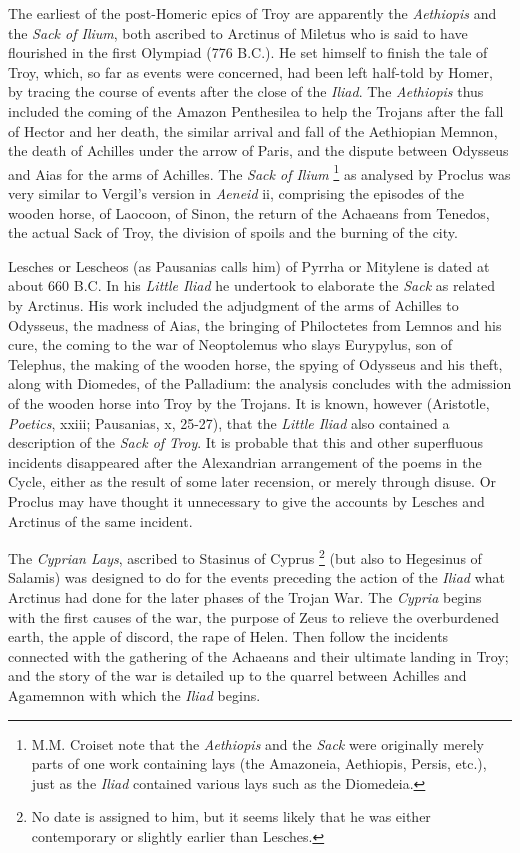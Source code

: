 The earliest of the post-Homeric epics of Troy are apparently the
\emph{Aethiopis} and the \emph{Sack of Ilium}, both ascribed to Arctinus of
Miletus who is said to have flourished in the first Olympiad (776 B.C.). He set
himself to finish the tale of Troy, which, so far as events were concerned, had
been left half-told by Homer, by tracing the course of events after the close
of the \emph{Iliad}. The \emph{Aethiopis} thus included the coming of the
Amazon Penthesilea to help the Trojans after the fall of Hector and her death,
the similar arrival and fall of the Aethiopian Memnon, the death of Achilles
under the arrow of Paris, and the dispute between Odysseus and Aias for the
arms of Achilles. The \emph{Sack of Ilium} \footnote{M.M. Croiset note that the
\emph{Aethiopis} and the \emph{Sack} were originally merely parts of one work
containing lays (the Amazoneia, Aethiopis, Persis, etc.), just as the
\emph{Iliad} contained various lays such as the Diomedeia.} as
analysed by Proclus was very similar to Vergil’s version in \emph{Aeneid}
ii, comprising the episodes of the wooden horse, of Laocoon, of Sinon, the
return of the Achaeans from Tenedos, the actual Sack of Troy, the division of
spoils and the burning of the city.

Lesches or Lescheos (as Pausanias calls him) of Pyrrha or Mitylene is dated at
about 660 B.C. In his \emph{Little Iliad} he undertook to elaborate the
\emph{Sack} as related by Arctinus. His work included the adjudgment of the
arms of Achilles to Odysseus, the madness of Aias, the bringing of Philoctetes
from Lemnos and his cure, the coming to the war of Neoptolemus who slays
Eurypylus, son of Telephus, the making of the wooden horse, the spying of
Odysseus and his theft, along with Diomedes, of the Palladium: the analysis
concludes with the admission of the wooden horse into Troy by the Trojans. It
is known, however (Aristotle, \emph{Poetics}, xxiii; Pausanias, x, 25-27), that
the \emph{Little Iliad} also contained a description of the \emph{Sack of
Troy}. It is probable that this and other superfluous incidents disappeared
after the Alexandrian arrangement of the poems in the Cycle, either as the
result of some later recension, or merely through disuse. Or Proclus may have
thought it unnecessary to give the accounts by Lesches and Arctinus of the same
incident.

The \emph{Cyprian Lays}, ascribed to Stasinus of Cyprus \footnote{No date is assigned to
him, but it seems likely that he was either contemporary or slightly earlier
than Lesches.} (but also to Hegesinus of
Salamis) was designed to do for the events preceding the action of the
\emph{Iliad} what Arctinus had done for the later phases of the Trojan War. The
\emph{Cypria} begins with the first causes of the war, the purpose of Zeus to
relieve the overburdened earth, the apple of discord, the rape of Helen. Then
follow the incidents connected with the gathering of the Achaeans and their
ultimate landing in Troy; and the story of the war is detailed up to the
quarrel between Achilles and Agamemnon with which the \emph{Iliad} begins.


